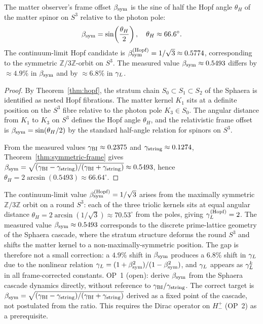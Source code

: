 \begin{theorem}
\label{thm:bsym-hopf}
The matter observer's frame offset $\beta_{\mathrm{sym}}$ is the sine of half the Hopf
angle $\theta_H$ of the matter spinor on $S^3$ relative to the photon
pole:
\[
  \beta_{\mathrm{sym}} = \sin\!\left(\frac{\theta_H}{2}\right),\quad\theta_H\approx 66.6^\circ.
\]
The continuum-limit Hopf candidate is $\beta_{\mathrm{sym}}^{(\rm Hopf)}=1/\sqrt{3}\approx
0.5774$, corresponding to the symmetric $\mathbb{Z}/3\mathbb{Z}$-orbit
on $S^3$. The measured value $\beta_{\mathrm{sym}}\approx 0.5493$ differs by
$\approx 4.9\%$ in $\beta_{\mathrm{sym}}$ and by $\approx 6.8\%$ in $\gamma_L$.
\end{theorem}

\begin{proof}
By Theorem~\ref{thm:hopf}, the stratum chain
$S_0\subset S_1\subset S_2$ of the Sphaera is identified as nested Hopf
fibrations. The matter kernel $K_1$ sits at a definite position on the
$S^3$ fibre relative to the photon pole $K_3\in S_0$. The angular
distance from $K_1$ to $K_3$ on $S^3$ defines the Hopf angle $\theta_H$,
and the relativistic frame offset is $\beta_{\mathrm{sym}}=\sin(\theta_H/2)$ by the
standard half-angle relation for spinors on $S^3$.

From the measured values $\gamma_{\mathrm{BI}}\approx 0.2375$ and
$\gamma_{\mathrm{string}}\approx 0.1274$, Theorem~\ref{thm:symmetric-frame} gives
$\beta_{\mathrm{sym}}=\sqrt{(\gamma_{\mathrm{BI}}-\gamma_{\mathrm{string}})/(\gamma_{\mathrm{BI}}+\gamma_{\mathrm{string}})}\approx 0.5493$, hence
$\theta_H=2\arcsin(0.5493)\approx 66.64^\circ$.
\end{proof}

\begin{remark}
\label{rem:bsym-hopf-gap}
The continuum-limit value $\beta_{\mathrm{sym}}^{(\rm Hopf)}=1/\sqrt{3}$ arises from
the maximally symmetric $\mathbb{Z}/3\mathbb{Z}$ orbit on a round $S^3$:
each of the three triolic kernels sits at equal angular distance
$\theta_H=2\arcsin(1/\sqrt{3})\approx 70.53^\circ$ from the poles,
giving $\gamma_L^{(\rm Hopf)}=2$.
The measured value $\beta_{\mathrm{sym}}\approx 0.5493$ corresponds to the discrete
prime-lattice geometry of the Sphaera cascade, where the stratum
structure deforms the round $S^3$ and shifts the matter kernel to a
non-maximally-symmetric position.
The gap is therefore not a small correction: a $4.9\%$ shift in $\beta_{\mathrm{sym}}$
produces a $6.8\%$ shift in $\gamma_L$ due to the nonlinear relation
$\gamma_L=(1+\beta_{\mathrm{sym}}^2)/(1-\beta_{\mathrm{sym}}^2)$, and $\gamma_L$ appears as $\gamma_L^k$ in all
frame-corrected constants.
OP~1 (open): derive $\beta_{\mathrm{sym}}$ from the Sphaera cascade dynamics directly,
without reference to $\gamma_{\mathrm{BI}}/\gamma_{\mathrm{string}}$. The correct target is
$\beta_{\mathrm{sym}}=\sqrt{(\gamma_{\mathrm{BI}}-\gamma_{\mathrm{string}})/(\gamma_{\mathrm{BI}}+\gamma_{\mathrm{string}})}$ derived as a fixed point
of the cascade, not postulated from the ratio. This requires the
Dirac operator on $H^+_-$ (OP~2) as a prerequisite.
\end{remark}

